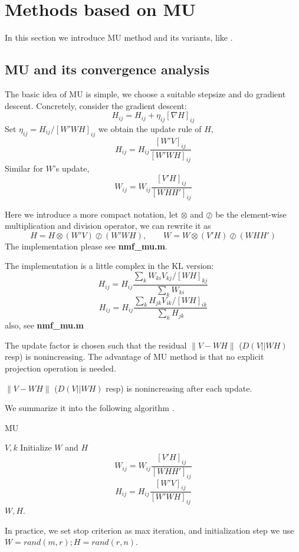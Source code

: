 \documentclass{article}
\renewcommand{\grad}{\nabla}
\begin{document}
\section{Methods based on MU}
In this section we introduce MU method and its variants, like \cite{mu,muacc,mumod,mumod2}.
\subsection{MU and its convergence analysis}
The basic idea of MU is simple, we choose a suitable stepsize and do gradient descent. Concretely, consider the gradient descent:
$$ H_{ij} = H_{ij} + \eta_{ij}[\grad H]_{ij}$$
Set $\eta_{ij} = H_{ij}/[W'WH]_{ij}$ we obtain the update rule of $H$, 
$$ H_{ij} = H_{ij}\frac{[W'V]_{ij}}{[W'WH]_{ij}}$$
Similar for $W$'s update, 
$$W_{ij} = W_{ij}\frac{[V'H]_{ij}}{[WHH']_{ij}}$$

Here we introduce a more compact notation, let $\otimes$ and  $\oslash$ be the element-wise multiplication and division operator, we can rewrite it as 
$$H = H\otimes (W'V) \oslash (W'WH), \qquad W = W\otimes (V'H) \oslash (WHH')$$
The implementation please see \textbf{nmf\_mu.m}.

The implementation is a little complex in the KL version:
$$H_{ij} = H_{ij}\frac{\sum_k W_{ki}V_{kj}/[WH]_{kj}}{\sum_k W_{ki}}$$
$$H_{ij} = H_{ij}\frac{\sum_k H_{jk}V_{ik}/[WH]_{ik}}{\sum_k H_{jk}}$$
also, see \textbf{nmf\_mu.m}

The update factor is chosen such that the residual $\|V-WH\|$ ($D(V||WH)$ resp) is nonincreasing. The advantage of MU method is that no explicit projection operation is needed.

\begin{proposition}
	$\|V-WH\|$ ($D(V||WH)$ resp) is nonincreasing after each update.
\end{proposition}

We summarize it into the following algorithm \cite{mu}.
\begin{algorithm}[H]
	\caption{MU}
	\begin{algorithmic}[1]
		\REQUIRE $V, k$
		\STATE Initialize $W$ and $H$ 
		\STATE $$W_{ij} = W_{ij}\frac{[V'H]_{ij}}{[WHH']_{ij}}$$
		\STATE $$ H_{ij} = H_{ij}\frac{[W'V]_{ij}}{[W'WH]_{ij}}$$
		\ENDWHILE
		\STATE \Return $W,H$.
	\end{algorithmic}
\end{algorithm}

In practice, we set stop criterion as max iteration, and initialization step we use $W = rand(m,r);H=rand(r,n)$. 
\end{document}
